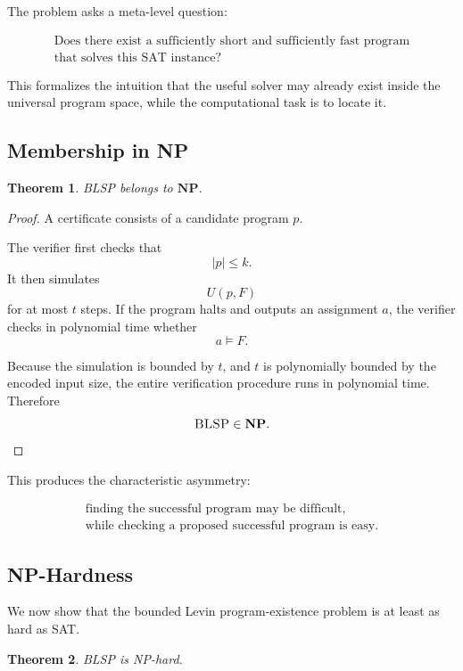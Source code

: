 \documentclass[11pt]{article}
\theoremstyle{plain}
\newtheorem{theorem}{Theorem}[section]
\theoremstyle{definition}
\begin{document}
The problem asks a meta-level question:

\[
\boxed{\begin{gathered}
\text{Does there exist a sufficiently short and sufficiently fast program}\\
\text{that solves this SAT instance?}
\end{gathered}}
\]

This formalizes the intuition that the useful solver may already exist inside
the universal program space, while the computational task is to locate it.

\subsection{Membership in NP}

\begin{theorem}
\label{thm:blsp-in-np}
\textsc{BLSP} belongs to \(\mathbf{NP}\).
\end{theorem}

\begin{proof}
A certificate consists of a candidate program \(p\).

The verifier first checks that
\[
    |p|\leq k.
\]
It then simulates
\[
    U(p,F)
\]
for at most \(t\) steps.  If the program halts and outputs an assignment
\(a\), the verifier checks in polynomial time whether
\[
    a\models F.
\]

Because the simulation is bounded by \(t\), and \(t\) is polynomially bounded
by the encoded input size, the entire verification procedure runs in
polynomial time.  Therefore
\[
    \textsc{BLSP}\in\mathbf{NP}.
\]
\end{proof}

This produces the characteristic asymmetry:

\[
\boxed{\begin{gathered}
\text{finding the successful program may be difficult,}\\
\text{while checking a proposed successful program is easy.}
\end{gathered}}
\]

\subsection{NP-Hardness}

We now show that the bounded Levin program-existence problem is at least as
hard as SAT.

\begin{theorem}
\label{thm:blsp-np-hard}
\textsc{BLSP} is NP-hard.
\end{theorem}
\end{document}
